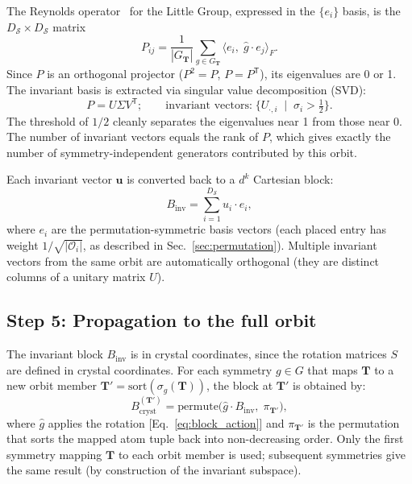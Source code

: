 \documentclass[twocolumn,amsmath,amssymb,aps,prb,10pt,floatfix]{revtex4-2}
\newcommand{\vT}{\mathbf{T}}
\begin{document}
The Reynolds operator~\cite{Serre1977,Sturmfels2008} for the Little Group, expressed in the $\{e_i\}$ basis, is the $D_{\mathcal{S}} \times D_{\mathcal{S}}$ matrix
\begin{equation}
P_{ij} = \frac{1}{|G_{\vT}|} \sum_{g \in G_{\vT}} \langle e_i,\; \hat{g} \cdot e_j \rangle_F.
\label{eq:reynolds}
\end{equation}
Since $P$ is an orthogonal projector ($P^2 = P$, $P = P^{\mathsf{T}}$), its eigenvalues are 0 or 1.
The invariant basis is extracted via singular value decomposition (SVD):
\begin{equation}
P = U \Sigma V^{\mathsf{T}};
\qquad
\text{invariant vectors:}\;
\{U_{\cdot, i} \;\mid\; \sigma_i > \tfrac{1}{2}\}.
\label{eq:svd}
\end{equation}
The threshold of $1/2$ cleanly separates the eigenvalues near 1 from those near 0.
The number of invariant vectors equals the rank of $P$, which gives exactly the number of symmetry-independent generators contributed by this orbit.

Each invariant vector $\mathbf{u}$ is converted back to a $d^k$ Cartesian block:
\begin{equation}
B_{\mathrm{inv}} = \sum_{i=1}^{D_{\mathcal{S}}} u_i \cdot e_i,
\label{eq:block_from_svd}
\end{equation}
where $e_i$ are the permutation-symmetric basis vectors (each placed entry has weight $1/\sqrt{|\mathcal{O}_i|}$, as described in Sec.~\ref{sec:permutation}).
Multiple invariant vectors from the same orbit are automatically orthogonal (they are distinct columns of a unitary matrix $U$).

\subsection{Step 5: Propagation to the full orbit}

The invariant block $B_{\mathrm{inv}}$ is in crystal coordinates, since the rotation matrices $S$ are defined in crystal coordinates.
For each symmetry $g \in G$ that maps $\vT$ to a new orbit member $\vT' = \mathrm{sort}(\sigma_g(\vT))$, the block at $\vT'$ is obtained by:
\begin{equation}
B^{(\vT')}_{\mathrm{cryst}} = \text{permute}\bigl(\hat{g} \cdot B_{\mathrm{inv}},\; \pi_{\vT'}\bigr),
\label{eq:propagation}
\end{equation}
where $\hat{g}$ applies the rotation [Eq.~\eqref{eq:block_action}] and $\pi_{\vT'}$ is the permutation that sorts the mapped atom tuple back into non-decreasing order.
Only the first symmetry mapping $\vT$ to each orbit member is used; subsequent symmetries give the same result (by construction of the invariant subspace).
\end{document}
